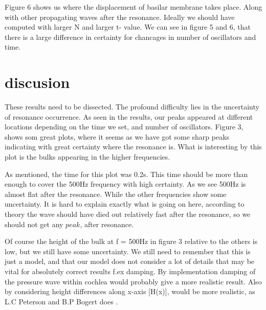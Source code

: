 \documentclass[twoside,twocolumn]{article}
\begin{document}
Figure 6 shows us where the displacement of basilar membrane takes place. Along with other propagating waves after the resonance. Ideally we should have computed with larger N and larger t- value. We can see in figure 5 and 6, that there is a large difference in certainty for chancages in number of oscillators and time. 

\bigskip

\section{discusion}

These results need to be dissected. The profound difficulty lies in the uncertainty of resonance occurrence.  As seen in the results, our peaks appeared at different locations depending on the time we set, and number of oscillators. Figure 3, shows som great plots, where it seems as we have got some sharp peaks indicating with great certainty where the resonance is. What is interesting by this plot is the bulks appearing in the higher frequencies. 

\bigskip

As mentioned, the time for this plot was 0.2s. This time should be more than enough to cover the 500Hz frequency with high certainty.  As we see 500Hz is almost flat after the resonance. While the other frequencies show some uncertainty. It is hard to explain exactly what is going on here, according to theory the wave should have died out relatively fast after the resonance, so we should not get any $peak$, after resonance. 

\bigskip

Of course the height of the bulk at f = 500Hz in figure 3 relative to the others is low, but we still have some uncertainty. We still need to remember that this is just a model, and that our model does not consider a lot of details that may be vital for absolutely correct results f.ex damping. By implementation damping of the pressure wave within cochlea would  probably give a more realistic result. Also by considering height differences along x-axis [H(x)], would be more realistic, as L.C Peterson and B.P Bogert does \cite{Peterson2005} . 

 \bigskip
\end{document}
